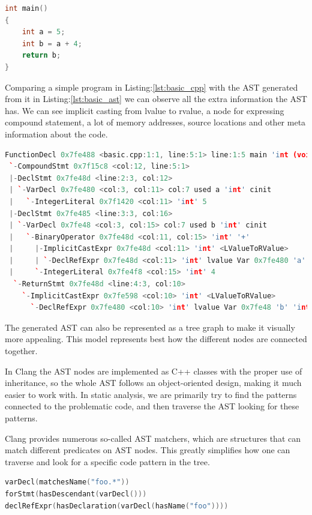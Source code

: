 \begin{lstlisting}[language=c++,frame=single, caption={A simple C++ program}, label={lst:basic_cpp}]
int main() 
{
	int a = 5;
	int b = a + 4;
	return b;
}
\end{lstlisting}
\par Comparing a simple program in Listing:\ref{lst:basic_cpp} with the AST generated from it in Listing:\ref{lst:basic_ast} we can observe all the extra information the AST has. We can see implicit casting from lvalue to rvalue, a node for expressing compound statement, a lot of memory addresses, source locations and other meta information about the code.
\begin{lstlisting}[basicstyle=\scriptsize, language=c++,frame=single, caption={AST generated}, style=ast, label={lst:basic_ast}]
FunctionDecl 0x7fe488 <basic.cpp:1:1, line:5:1> line:1:5 main 'int (void)'
 `-CompoundStmt 0x7f15c8 <col:12, line:5:1>
 |-DeclStmt 0x7fe48d <line:2:3, col:12>
 | `-VarDecl 0x7fe480 <col:3, col:11> col:7 used a 'int' cinit
 |   `-IntegerLiteral 0x7f1420 <col:11> 'int' 5
 |-DeclStmt 0x7fe485 <line:3:3, col:16>
 | `-VarDecl 0x7fe48 <col:3, col:15> col:7 used b 'int' cinit
 |   `-BinaryOperator 0x7fe48d <col:11, col:15> 'int' '+'
 |     |-ImplicitCastExpr 0x7fe48d <col:11> 'int' <LValueToRValue>
 |     | `-DeclRefExpr 0x7fe48d <col:11> 'int' lvalue Var 0x7fe480 'a' 'int'
 |     `-IntegerLiteral 0x7fe4f8 <col:15> 'int' 4
  `-ReturnStmt 0x7fe48d <line:4:3, col:10>
    `-ImplicitCastExpr 0x7fe598 <col:10> 'int' <LValueToRValue>
      `-DeclRefExpr 0x7fe480 <col:10> 'int' lvalue Var 0x7fe48 'b' 'int'
\end{lstlisting}
\par The generated AST can also be represented as a tree graph to make it visually more appealing. This model represents best how the different nodes are connected together. \medskip
\par In Clang the AST nodes are implemented as C++ classes with the proper use of inheritance, so the whole AST follows an object-oriented design, making it much easier to work with. In static analysis, we are primarily try to find the patterns connected to the problematic code, and then traverse the AST looking for these patterns. \medskip
\par Clang provides numerous so-called AST matchers\cite{ast_reference}, which are structures that can match different predicates on AST nodes. This greatly simplifies how one can traverse and look for a specific code pattern in the tree. 
\begin{lstlisting}[language=c++,frame=single, caption={Basic AST matchers}, style=ast, label={lst:basic_match}]
varDecl(matchesName("foo.*"))
forStmt(hasDescendant(varDecl()))
declRefExpr(hasDeclaration(varDecl(hasName("foo"))))
\end{lstlisting}
